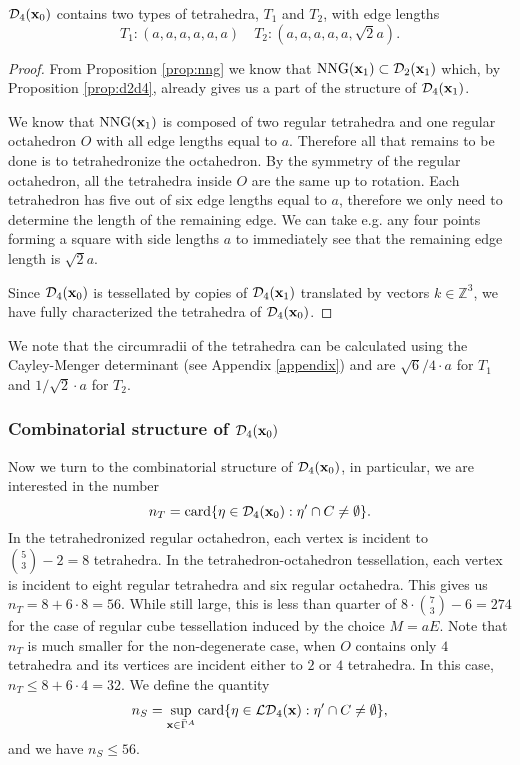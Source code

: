 \begin{proposition}\label{prop:tetraInTess} $\mathcal D_4({\mathbf{x}}_0)$ contains two types of tetrahedra, $T_1$ and $T_2$, with edge lengths
	$$T_1:(a,a,a,a,a,a) \quad T_2:(a,a,a,a,a,\sqrt 2a). $$
\end{proposition}
\begin{proof}
	From Proposition \ref{prop:nng} we know that $\mathrm{NNG}({\mathbf{x}}_1) \subset \mathcal D_2({\mathbf{x}}_1)$ which, by Proposition \ref{prop:d2d4}, already gives us a part of the structure of $\mathcal D_4({\mathbf{x}}_1)$. 

We know that $\text{NNG}({\mathbf{x}}_1)$ is composed of two regular tetrahedra and one regular octahedron $O$ with all edge lengths equal to $a$. Therefore all that remains to be done is to tetrahedronize the octahedron. By the symmetry of the regular octahedron, all the tetrahedra inside $O$ are the same up to rotation. Each tetrahedron has five out of six edge lengths equal to $a$, therefore we only need to determine the length of the remaining edge. We can take e.g. any four points forming a square with side lengths $a$ to immediately see that the remaining edge length is $\sqrt 2a$.

Since $\mathcal D_4({\mathbf{x}}_0)$ is tessellated by copies of $\mathcal D_4({\mathbf{x}}_1)$ translated by vectors $k\in\mathbb Z^3$, we have fully characterized the tetrahedra of $\mathcal D_4({\mathbf{x}}_0)$. 
\end{proof}

We note that the circumradii of the tetrahedra can be calculated using the Cayley-Menger determinant (see Appendix \ref{appendix}) and are $\sqrt{6}/4 \cdot a$ for $T_1$ and $1/\sqrt{2}\cdot a$ for $T_2$.

\subsubsection{Combinatorial structure of $\mathcal D_4({\mathbf{x}}_0)$}\label{sec:combinatorial}

Now we turn to the combinatorial structure of $\mathcal D_4({\mathbf{x}}_0)$, in particular, we are interested in the number
$$n_T = \mathrm{card}\{\eta \in \mathcal D_4({\mathbf{x}}_0): \eta' \cap C \neq \emptyset \}.$$
In the tetrahedronized regular octahedron, each vertex is incident to $\binom{5}{3}-2=8$ tetrahedra. In the tetrahedron-octahedron tessellation, each  vertex is incident to eight regular tetrahedra and six regular octahedra. This gives us $n_T = 8 + 6\cdot 8 = 56$. While still large, this is less than quarter of $8\cdot \binom{7}{3}-6 = 274$ for the case of regular cube tessellation induced by the choice $M=aE$. Note that $n_T$ is much smaller for the non-degenerate case, when $O$ contains only $4$ tetrahedra and its vertices are incident either to $2$ or $4$ tetrahedra. In this case, $n_T\leq 8+6\cdot 4 = 32$. We define the quantity
$$n_S = \sup_{{\mathbf{x}} \in \bar\Gamma^A} \mathrm{card}\{\eta \in \mathcal {LD}_4({\mathbf{x}}): \eta' \cap C \neq \emptyset \},$$
and we have $n_S \leq 56$.

